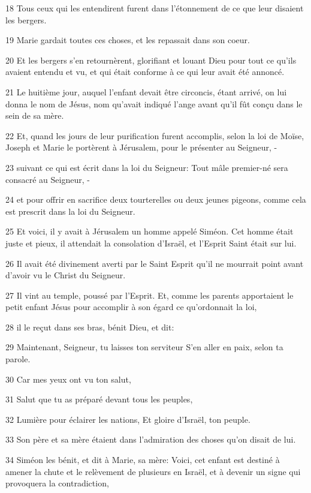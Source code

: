 \par 18 Tous ceux qui les entendirent furent dans l'étonnement de ce que leur disaient les bergers.
\par 19 Marie gardait toutes ces choses, et les repassait dans son coeur.
\par 20 Et les bergers s'en retournèrent, glorifiant et louant Dieu pour tout ce qu'ils avaient entendu et vu, et qui était conforme à ce qui leur avait été annoncé.
\par 21 Le huitième jour, auquel l'enfant devait être circoncis, étant arrivé, on lui donna le nom de Jésus, nom qu'avait indiqué l'ange avant qu'il fût conçu dans le sein de sa mère.
\par 22 Et, quand les jours de leur purification furent accomplis, selon la loi de Moïse, Joseph et Marie le portèrent à Jérusalem, pour le présenter au Seigneur, -
\par 23 suivant ce qui est écrit dans la loi du Seigneur: Tout mâle premier-né sera consacré au Seigneur, -
\par 24 et pour offrir en sacrifice deux tourterelles ou deux jeunes pigeons, comme cela est prescrit dans la loi du Seigneur.
\par 25 Et voici, il y avait à Jérusalem un homme appelé Siméon. Cet homme était juste et pieux, il attendait la consolation d'Israël, et l'Esprit Saint était sur lui.
\par 26 Il avait été divinement averti par le Saint Esprit qu'il ne mourrait point avant d'avoir vu le Christ du Seigneur.
\par 27 Il vint au temple, poussé par l'Esprit. Et, comme les parents apportaient le petit enfant Jésus pour accomplir à son égard ce qu'ordonnait la loi,
\par 28 il le reçut dans ses bras, bénit Dieu, et dit:
\par 29 Maintenant, Seigneur, tu laisses ton serviteur S'en aller en paix, selon ta parole.
\par 30 Car mes yeux ont vu ton salut,
\par 31 Salut que tu as préparé devant tous les peuples,
\par 32 Lumière pour éclairer les nations, Et gloire d'Israël, ton peuple.
\par 33 Son père et sa mère étaient dans l'admiration des choses qu'on disait de lui.
\par 34 Siméon les bénit, et dit à Marie, sa mère: Voici, cet enfant est destiné à amener la chute et le relèvement de plusieurs en Israël, et à devenir un signe qui provoquera la contradiction,
